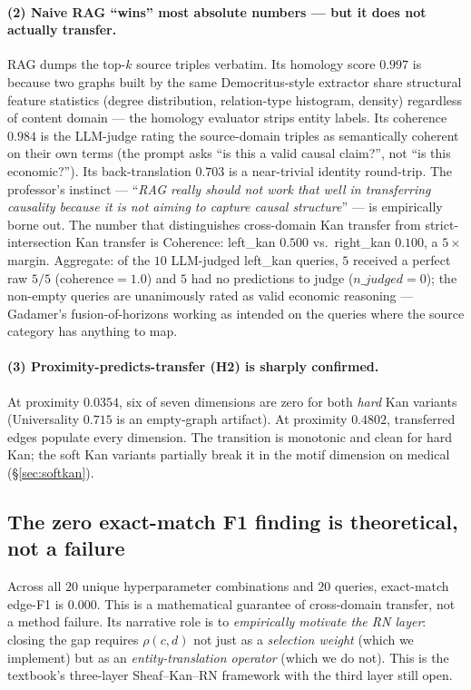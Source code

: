 \documentclass[10pt,letterpaper]{article}
\begin{document}
\paragraph{(2) Naive RAG ``wins'' most absolute numbers --- but it does not actually transfer.} RAG dumps the top-$k$ source triples verbatim. Its homology score $0.997$ is because two graphs built by the same Democritus-style extractor share structural feature statistics (degree distribution, relation-type histogram, density) regardless of content domain --- the homology evaluator strips entity labels. Its coherence $0.984$ is the LLM-judge rating the source-domain triples as semantically coherent on their own terms (the prompt asks ``is this a valid causal claim?'', not ``is this economic?''). Its back-translation $0.703$ is a near-trivial identity round-trip. The professor's instinct --- ``\emph{RAG really should not work that well in transferring causality because it is not aiming to capture causal structure}'' --- is empirically borne out. The number that distinguishes cross-domain Kan transfer from strict-intersection Kan transfer is Coherence: left\_kan $0.500$ vs.\ right\_kan $0.100$, a $5{\times}$ margin. Aggregate: of the $10$ LLM-judged left\_kan queries, $5$ received a perfect raw $5/5$ ($\text{coherence}{=}1.0$) and $5$ had no predictions to judge ($n\_judged{=}0$); the non-empty queries are unanimously rated as valid economic reasoning --- Gadamer's fusion-of-horizons working as intended on the queries where the source category has anything to map.

\paragraph{(3) Proximity-predicts-transfer (H2) is sharply confirmed.} At proximity $0.0354$, six of seven dimensions are zero for both \emph{hard} Kan variants (Universality $0.715$ is an empty-graph artifact). At proximity $0.4802$, transferred edges populate every dimension. The transition is monotonic and clean for hard Kan; the soft Kan variants partially break it in the motif dimension on medical (\S\ref{sec:softkan}).

\subsection{The zero exact-match F1 finding is theoretical, not a failure}

Across all $20$ unique hyperparameter combinations and $20$ queries, exact-match edge-F1 is $0.000$. This is a mathematical guarantee of cross-domain transfer, not a method failure. Its narrative role is to \emph{empirically motivate the RN layer}: closing the gap requires $\rho(c, d)$ not just as a \emph{selection weight} (which we implement) but as an \emph{entity-translation operator} (which we do not). This is the textbook's three-layer Sheaf--Kan--RN framework with the third layer still open.
\end{document}
